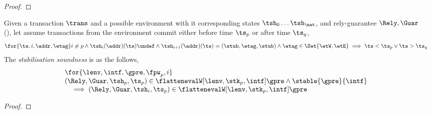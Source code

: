 \begin{proof}
\end{proof}

\begin{lem}
\label{lem:stable-sound}

Given a transaction \( \trans \) and a possible environment with it corresponding states \( \tsh_{0} \dots \tsh_{\nat} \), and rely-guarantee \( \Rely, \Guar \) (), let assume transactions from the environment commit either before time \( \ts_{p} \) or after time \( \ts_{q} \),
\[
    \for{\ts,i,\addr,\etag} 
    i \neq p 
    \land \tsh_{i}(\addr)(\ts)\undef 
    \land \tsh_{i + 1}(\addr)(\ts) = (\stub, \etag, \stub) 
    \land \etag \in \Set{\etW, \etE} 
    \implies \ts < \ts_{p} \lor \ts > \ts_{q}
\]
The \emph{stabilisation soundness} is as the follows,
\[
\begin{array}{@{}l@{}}
    \for{ \lenv, \intf, \gpre, \fpw_{p}, i}  \\
    (\Rely, \Guar, \tsh_{p}, \ts_{p}) \in \flattenevalW[\lenv, \stk_{p}, \intf]{\gpre}
    \land \stable{\gpre}{\intf} \\
    \quad \implies (\Rely, \Guar, \tsh_{i}, \ts_{p}) \in \flattenevalW[\lenv, \stk_{p}, \intf]{\gpre}
\end{array}
\]
\end{lem}
\begin{proof}
\end{proof}

